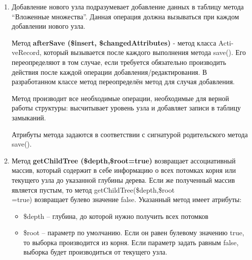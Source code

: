 \documentclass[a4paper,14pt]{extreport}
\theoremstyle{definition}
\begin{document}
\begin{enumerate}
\item Добавление нового узла подразумевает добавление данных в таблицу метода “Вложенные множества”. Данная операция должна вызываться при каждом добавлении нового узла.

Метод \textbf{afterSave (\$insert, \$changedAttributes)} - метод класса Acti-veRecord, который вызывается после каждого выполнения метода save(). Его переопределяют в том случае, если требуется обязательно производить действия после каждой операции добавления/редактирования. В разработанном классе метод переопределён метод для случая добавления.

Метод производит все необходимые операции, необходимые для верной работы структуры: высчитывает уровень узла и добавляет записи в таблицу замыканий.

Атрибуты метода задаются в соответствии с сигнатурой родительского метода save().
\item Метод \textbf{getChildTree (\$depth,\$root=true)} возвращает ассоциативный массив, который содержит в себе информацию о всех потомках корня или текущего узла до указанной глубины дерева. Если же полученный массив является пустым, то метод getChildTree(\$depth,\$root\\=true) возвращает булево значение false.
Указанный метод имеет атрибуты:
\begin{itemize}
\item \$depth – глубина, до которой нужно получить всех потомков
\item \$root – параметр по умолчанию. Если он равен булевому значению true, то выборка производится из корня. Если параметр задать равным false, выборка будет производиться от текущего узла.
\end{itemize}


\end{enumerate}
\end{document}

